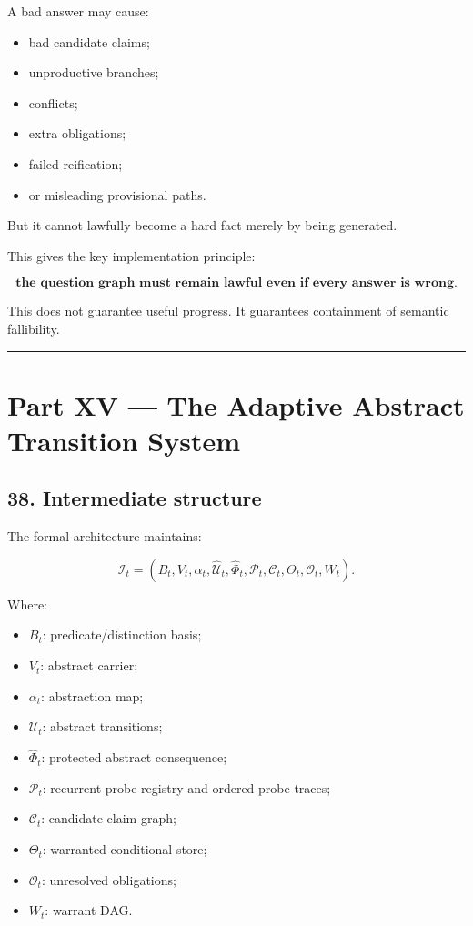 \documentclass[
]{article}
\providecommand{\tightlist}{%
  \setlength{\itemsep}{0pt}\setlength{\parskip}{0pt}}
\begin{document}
A bad answer may cause:

\begin{itemize}
\tightlist
\item
  bad candidate claims;
\item
  unproductive branches;
\item
  conflicts;
\item
  extra obligations;
\item
  failed reification;
\item
  or misleading provisional paths.
\end{itemize}

But it cannot lawfully become a hard fact merely by being generated.

This gives the key implementation principle:

\[
\boxed{
\textbf{the question graph must remain lawful even if every answer is wrong.}
}
\]

This does not guarantee useful progress. It guarantees containment of
semantic fallibility.

\begin{center}\rule{0.5\linewidth}{0.5pt}\end{center}

\section{Part XV --- The Adaptive Abstract Transition
System}\label{part-xv-the-adaptive-abstract-transition-system}

\subsection{38. Intermediate structure}\label{intermediate-structure}

The formal architecture maintains:

\[
\boxed{
\mathcal I_t
=
(
B_t,
V_t,
\alpha_t,
\widehat{\mathcal U}_t,
\widehat\Phi_t,
\mathcal P_t,
\mathcal C_t,
\Theta_t,
\mathcal O_t,
W_t
).
}
\]

Where:

\begin{itemize}
\tightlist
\item
  \(B_t\): predicate/distinction basis;
\item
  \(V_t\): abstract carrier;
\item
  \(\alpha_t\): abstraction map;
\item
  \(\widehat{\mathcal U}_t\): abstract transitions;
\item
  \(\widehat\Phi_t\): protected abstract consequence;
\item
  \(\mathcal P_t\): recurrent probe registry and ordered probe traces;
\item
  \(\mathcal C_t\): candidate claim graph;
\item
  \(\Theta_t\): warranted conditional store;
\item
  \(\mathcal O_t\): unresolved obligations;
\item
  \(W_t\): warrant DAG.
\end{itemize}
\end{document}
